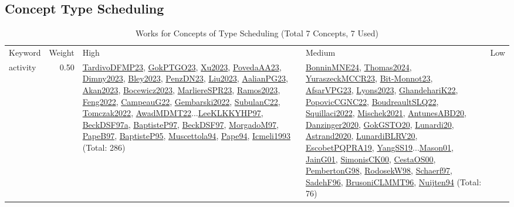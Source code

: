 \clearpage
\subsection{Concept Type Scheduling}
\label{sec:Scheduling}
\label{Scheduling}
{\scriptsize
\begin{longtable}{p{3cm}r>{\raggedright\arraybackslash}p{6cm}>{\raggedright\arraybackslash}p{6cm}>{\raggedright\arraybackslash}p{8cm}}
\rowcolor{white}\caption{Works for Concepts of Type Scheduling (Total 7 Concepts, 7 Used)}\\ \toprule
\rowcolor{white}Keyword & Weight & High & Medium & Low\\ \midrule\endhead
\bottomrule
\endfoot
\index{activity}\index{Scheduling!activity}activity &  0.50 & \hyperref[detail:TardivoDFMP23]{TardivoDFMP23}, \hyperref[detail:GokPTGO23]{GokPTGO23}, \hyperref[detail:Xu2023]{Xu2023}, \hyperref[detail:PovedaAA23]{PovedaAA23}, \hyperref[detail:Dimny2023]{Dimny2023}, \hyperref[detail:Bley2023]{Bley2023}, \hyperref[detail:PenzDN23]{PenzDN23}, \hyperref[detail:Liu2023]{Liu2023}, \hyperref[detail:AalianPG23]{AalianPG23}, \hyperref[detail:Akan2023]{Akan2023}, \hyperref[detail:Bocewicz2023]{Bocewicz2023}, \hyperref[detail:MarliereSPR23]{MarliereSPR23}, \hyperref[detail:Ramos2023]{Ramos2023}, \hyperref[detail:Feng2022]{Feng2022}, \hyperref[detail:CampeauG22]{CampeauG22}, \hyperref[detail:Gembarski2022]{Gembarski2022}, \hyperref[detail:SubulanC22]{SubulanC22}, \hyperref[detail:Tomczak2022]{Tomczak2022}, \hyperref[detail:AwadMDMT22]{AwadMDMT22}...\hyperref[detail:LeeKLKKYHP97]{LeeKLKKYHP97}, \hyperref[detail:BeckDSF97a]{BeckDSF97a}, \hyperref[detail:BaptisteP97]{BaptisteP97}, \hyperref[detail:BeckDSF97]{BeckDSF97}, \hyperref[detail:MorgadoM97]{MorgadoM97}, \hyperref[detail:PapeB97]{PapeB97}, \hyperref[detail:BaptisteP95]{BaptisteP95}, \hyperref[detail:Muscettola94]{Muscettola94}, \hyperref[detail:Pape94]{Pape94}, \hyperref[detail:Icmeli1993]{Icmeli1993} (Total: 286) & \hyperref[detail:BonninMNE24]{BonninMNE24}, \hyperref[detail:Thomas2024]{Thomas2024}, \hyperref[detail:YuraszeckMCCR23]{YuraszeckMCCR23}, \hyperref[detail:Bit-Monnot23]{Bit-Monnot23}, \hyperref[detail:AfsarVPG23]{AfsarVPG23}, \hyperref[detail:Lyons2023]{Lyons2023}, \hyperref[detail:GhandehariK22]{GhandehariK22}, \hyperref[detail:PopovicCGNC22]{PopovicCGNC22}, \hyperref[detail:BoudreaultSLQ22]{BoudreaultSLQ22}, \hyperref[detail:Squillaci2022]{Squillaci2022}, \hyperref[detail:Mischek2021]{Mischek2021}, \hyperref[detail:AntunesABD20]{AntunesABD20}, \hyperref[detail:Danzinger2020]{Danzinger2020}, \hyperref[detail:GokGSTO20]{GokGSTO20}, \hyperref[detail:Lunardi20]{Lunardi20}, \hyperref[detail:Astrand2020]{Astrand2020}, \hyperref[detail:LunardiBLRV20]{LunardiBLRV20}, \hyperref[detail:EscobetPQPRA19]{EscobetPQPRA19}, \hyperref[detail:YangSS19]{YangSS19}...\hyperref[detail:Mason01]{Mason01}, \hyperref[detail:JainG01]{JainG01}, \hyperref[detail:SimonisCK00]{SimonisCK00}, \hyperref[detail:CestaOS00]{CestaOS00}, \hyperref[detail:PembertonG98]{PembertonG98}, \hyperref[detail:RodosekW98]{RodosekW98}, \hyperref[detail:Schaerf97]{Schaerf97}, \hyperref[detail:SadehF96]{SadehF96}, \hyperref[detail:BrusoniCLMMT96]{BrusoniCLMMT96}, \hyperref[detail:Nuijten94]{Nuijten94} (Total: 76) 
\end{longtable}}
